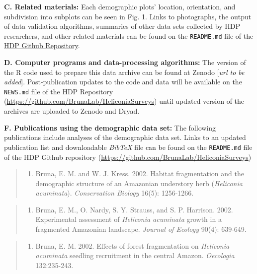 \documentclass[
  12pt,
  man, donotrepeattitle,floatsintext]{apa6}
\providecommand{\tightlist}{%
  \setlength{\itemsep}{0pt}\setlength{\parskip}{0pt}}
\begin{document}
\noindent
\textbf{C. Related materials:} Each demographic plots' location, orientation, and subdivision into subplots can be seen in Fig. 1. Links to photographs, the output of data validation algorithms, summaries of other data sets collected by HDP researchers, and other related materials can be found on the \texttt{README.md} file of the \href{https://github.com/BrunaLab/HeliconiaSurveys}{HDP Github Repository}.

\noindent
\textbf{D. Computer programs and data-processing algorithms:} The version of the R code used to prepare this data archive can be found at Zenodo {[}\emph{url to be added}{]}. Post-publication updates to the code and data will be available on the \texttt{NEWS.md} file of the HDP Repository (\url{https://github.com/BrunaLab/HeliconiaSurveys}) until updated version of the archives are uploaded to Zenodo and Dryad.

\noindent
\textbf{F. Publications using the demographic data set:} The following publications include analyses of the demographic data set. Links to an updated publication list and downloadable \emph{BibTeX} file can be found on the \texttt{README.md} file of the HDP Github repository (\url{https://github.com/BrunaLab/HeliconiaSurveys})

\begin{quote}
\begin{enumerate}
\def\labelenumi{\arabic{enumi}.}
\tightlist
\item
  Bruna, E. M. and W. J. Kress. 2002. Habitat fragmentation and the demographic structure of an Amazonian understory herb (\emph{Heliconia acuminata}). \emph{Conservation Biology} 16(5): 1256-1266.
\end{enumerate}
\end{quote}

\begin{quote}
\begin{enumerate}
\def\labelenumi{\arabic{enumi}.}
\setcounter{enumi}{1}
\tightlist
\item
  Bruna, E. M., O. Nardy, S. Y. Strauss, and S. P. Harrison. 2002. Experimental assessment of \emph{Heliconia acuminata} growth in a fragmented Amazonian landscape. \emph{Journal of Ecology} 90(4): 639-649.
\end{enumerate}
\end{quote}

\begin{quote}
\begin{enumerate}
\def\labelenumi{\arabic{enumi}.}
\setcounter{enumi}{2}
\tightlist
\item
  Bruna, E. M. 2002. Effects of forest fragmentation on \emph{Heliconia acuminata} seedling recruitment in the central Amazon. \emph{Oecologia} 132:235-243.
\end{enumerate}
\end{quote}
\end{document}
